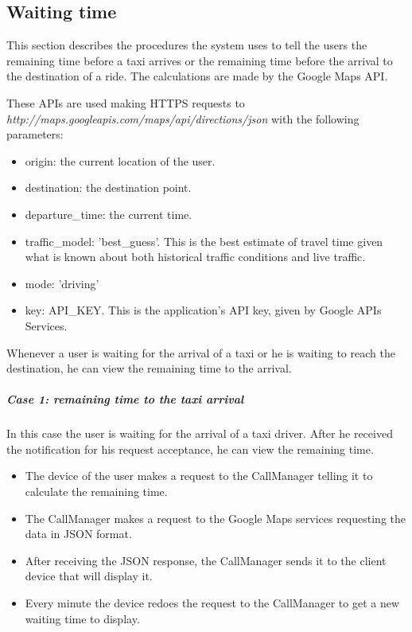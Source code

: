 \subsection{Waiting time}
This section describes the procedures the system uses to tell the users the remaining time before a taxi arrives or the remaining time before the arrival to the destination of a ride.
The calculations are made by the Google Maps API.

These APIs are used making HTTPS requests to \newline \emph{http://maps.googleapis.com/maps/api/directions/json}
with the following parameters:
\begin{itemize}
    \item origin: the current location of the user.
    \item destination: the destination point.
    \item departure\_time: the current time.
    \item traffic\_model: 'best\_guess'. This is the best estimate of travel time given what is known about both historical traffic conditions and live traffic. 
    \item mode: 'driving'
    \item key: API\_KEY. This is the application's API key, given by Google APIs Services.
\end{itemize}

Whenever a user is waiting for the arrival of a taxi or he is waiting to reach the destination, he can view the remaining time to the arrival.

\subparagraph{Case 1: remaining time to the taxi arrival}
In this case the user is waiting for the arrival of a taxi driver.
After he received the notification for his request acceptance, he can view the remaining time.
\begin{itemize}
    \item The device of the user makes a request to the CallManager telling it to calculate the remaining time.
    \item The CallManager makes a request to the Google Maps services requesting the data in JSON format.
    \item After receiving the JSON response, the CallManager sends it to the client device that will display it.
    \item Every minute the device redoes the request to the CallManager to get a new waiting time to display.
\end{itemize}


